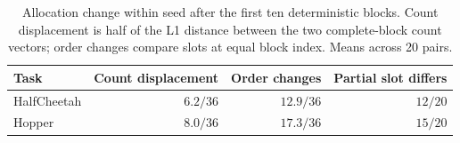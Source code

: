 \begin{table}[!htbp]
\centering\small\setlength{\tabcolsep}{4.5pt}
\caption{Allocation change within seed after the first ten deterministic blocks. Count displacement is half of the L1 distance between the two complete-block count vectors; order changes compare slots at equal block index. Means across 20 pairs.}
\label{tab:slot_shift}
\begin{tabular}{@{}lrrr@{}}
\toprule
Task & Count displacement & Order changes & Partial slot differs \\
\midrule
HalfCheetah & $6.2/36$ & $12.9/36$ & $12/20$ \\
Hopper & $8.0/36$ & $17.3/36$ & $15/20$ \\
\bottomrule
\end{tabular}
\end{table}
